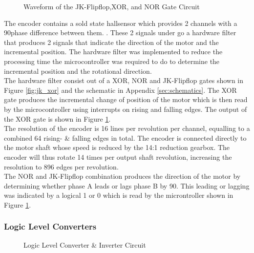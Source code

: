 \begin{figure}[h]
	\centering
	
	\caption{Waveform of the JK-Flipflop,XOR, and NOR Gate Circuit}
	\label{fig:jk_xor_waveform}
\end{figure}

The encoder contains a sold state hallsensor which provides 2 channels with a 90\textdegree \space phase difference between them. \citep{faulhaberencoder}. These 2 signals under go a hardware filter that produces 2 signals that indicate the direction of the motor and the incremental position. The hardware filter was implemented to reduce the processing time the microcontroller was required to do to determine the incremental position and the rotational direction.\\

The hardware filter consist out of a XOR, NOR and JK-Flipflop gates shown in Figure \ref{fig:jk_xor} and the schematic in Appendix \ref{sec:schematics}. The XOR gate produces the incremental change of position of the motor which is then read by the microcontroller using interrupts on rising and falling edges. The output of the XOR gate is shown in Figure \ref{fig:jk_xor_waveform}.\\

The resolution of the encoder is 16 lines per revolution per channel, equalling to a combined 64 rising- \& falling edges in total. The encoder is connected directly to the motor shaft whose speed is reduced by the 14:1 reduction gearbox. The encoder will thus rotate 14 times per output shaft revolution, increasing the resolution to 896 edges per revolution.\\

 The NOR and JK-Flipflop combination produces the direction of the motor by determining whether phase A leads or lags phase B by 90\textdegree. This leading or lagging was indicated by a logical 1 or 0 which is read by the microntroller shown in Figure \ref{fig:jk_xor_waveform}.\\
 
 \subsubsection{Logic Level Converters}
 \begin{figure}[h]
 	\centering
 	
 	\caption{Logic Level Converter \& Inverter Circuit}
 	\label{fig:interterCirc}
 \end{figure}
 
